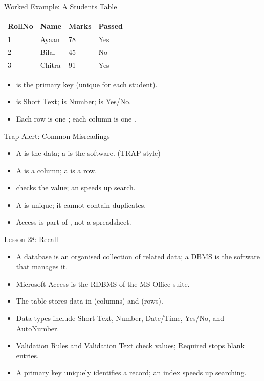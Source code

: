 \documentclass[aspectratio=169]{beamer}
\begin{document}
\begin{frame}{Worked Example: A Students Table}
  \begin{center}
    \begin{tabular}{p{}p{}p{}p{}}
      \toprule
      \textbf{RollNo} & \textbf{Name} & \textbf{Marks} & \textbf{Passed} \\
      \midrule
      1 & Ayaan & 78 & Yes \\
      2 & Bilal & 45 & No \\
      3 & Chitra & 91 & Yes \\
      \bottomrule
    \end{tabular}
  \end{center}
  \vspace{0.2cm}
  \begin{itemize}
    \item {} is the primary key (unique for each student).
    \item {} is Short Text;  is Number;  is
      Yes/No.
    \item Each row is one ; each column is one .
  \end{itemize}
\end{frame}

\begin{frame}{Trap Alert: Common Misreadings}
  \begin{itemize}
    \item A  is the data; a  is the software.
      (TRAP-style)
    \item A  is a column; a  is a row.
    \item {} checks the value; an  speeds up search.
    \item A  is unique; it cannot contain duplicates.
    \item Access is part of , not a spreadsheet.
  \end{itemize}
\end{frame}

\begin{frame}{Lesson 28: Recall}
  \begin{itemize}
    \item A database is an organised collection of related data; a DBMS is
      the software that manages it.
    \item Microsoft Access is the RDBMS of the MS Office suite.
    \item The table stores data in  (columns) and 
      (rows).
    \item Data types include Short Text, Number, Date/Time, Yes/No, and
      AutoNumber.
    \item Validation Rules and Validation Text check values; Required stops
      blank entries.
    \item A primary key uniquely identifies a record; an index speeds up
      searching.
  \end{itemize}
\end{frame}
\end{document}
